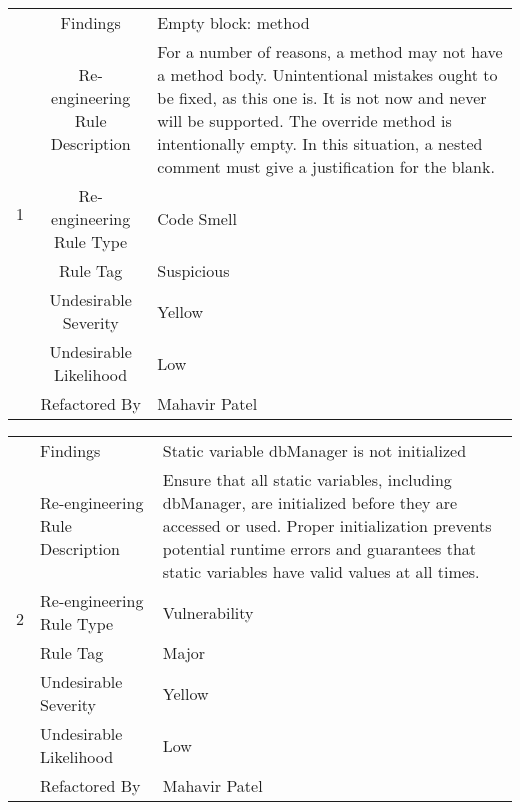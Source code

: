 \documentclass[12pt,english]{article}
\begin{document}
\begin{table}[!ht]
    \begin{tabularx}{\textwidth}{|c|c|X|}
    \hline
        \multirow{7}{*}{1} & Findings & Empty block: method \\ \cline{2-3}
        & Re-engineering Rule Description & For a number of reasons, a method may not have a method body.
        Unintentional mistakes ought to be fixed, as this one is.
        It is not now and never will be supported. 
        The override method is intentionally empty. In this situation, a nested comment must give a justification for the blank.
 \\ \cline{2-3}
        & Re-engineering Rule Type & Code Smell \\ \cline{2-3}
        & Rule Tag & Suspicious \\ \cline{2-3}
        & Undesirable Severity & Yellow \\ \cline{2-3}
        & Undesirable Likelihood & Low \\ \cline{2-3}
        & Refactored By & Mahavir Patel \\ \hline
    \end{tabularx}
\end{table}

\begin{table}[!ht]
    \begin{tabularx}{\textwidth}{|c|l|X|}
    \hline
        \multirow{7}{*}{2} & Findings & Static variable dbManager is not initialized \\ \cline{2-3}
        & Re-engineering Rule Description & Ensure that all static variables, including dbManager, are initialized before they are accessed or used. Proper initialization prevents potential runtime errors and guarantees that static variables have valid values at all times. \\ \cline{2-3}
        & Re-engineering Rule Type & Vulnerability \\ \cline{2-3}
        & Rule Tag & Major \\ \cline{2-3}
        & Undesirable Severity & Yellow \\ \cline{2-3}
        & Undesirable Likelihood & Low \\ \cline{2-3}
        & Refactored By & Mahavir Patel \\ \hline
    \end{tabularx}
\end{table}
\end{document}
